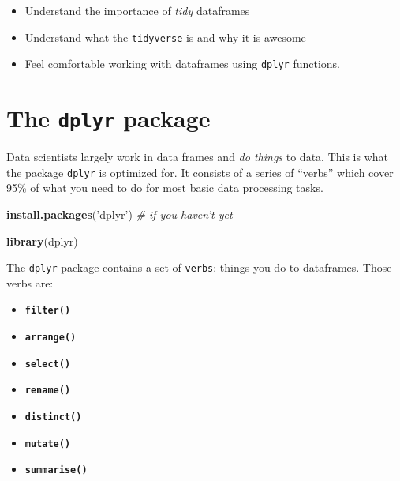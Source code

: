 \documentclass[
]{book}
\newenvironment{Shaded}{\begin{snugshade}}{\end{snugshade}}
\newcommand{\CommentTok}[1]{\textcolor[rgb]{0.56,0.35,0.01}{\textit{#1}}}
\newcommand{\KeywordTok}[1]{\textcolor[rgb]{0.13,0.29,0.53}{\textbf{#1}}}
\newcommand{\NormalTok}[1]{#1}
\newcommand{\StringTok}[1]{\textcolor[rgb]{0.31,0.60,0.02}{#1}}
\providecommand{\tightlist}{%
  \setlength{\itemsep}{0pt}\setlength{\parskip}{0pt}}
\begin{document}
\begin{itemize}
\tightlist
\item
  Understand the importance of \emph{tidy} dataframes
\item
  Understand what the \texttt{tidyverse} is and why it is awesome
\item
  Feel comfortable working with dataframes using \texttt{dplyr} functions.
\end{itemize}

\hypertarget{the-dplyr-package}{%
\section*{\texorpdfstring{The \texttt{dplyr} package}{The dplyr package}}\label{the-dplyr-package}}

Data scientists largely work in data frames and \emph{do things} to data. This is what the package \texttt{dplyr} is optimized for. It consists of a series of ``verbs'' which cover 95\% of what you need to do for most basic data processing tasks.

\begin{Shaded}
\begin{Highlighting}[]
\KeywordTok{install.packages}\NormalTok{(}\StringTok{'dplyr'}\NormalTok{) }\CommentTok{# if you haven't yet}
\end{Highlighting}
\end{Shaded}

\begin{Shaded}
\begin{Highlighting}[]
\KeywordTok{library}\NormalTok{(dplyr)}
\end{Highlighting}
\end{Shaded}

The \texttt{dplyr} package contains a set of \texttt{verbs}: things you do to dataframes. Those verbs are:

\begin{itemize}
\tightlist
\item
  \textbf{\texttt{filter()}}~\\
\item
  \textbf{\texttt{arrange()}}~\\
\item
  \textbf{\texttt{select()}}~\\
\item
  \textbf{\texttt{rename()}}~\\
\item
  \textbf{\texttt{distinct()}}~\\
\item
  \textbf{\texttt{mutate()}}~\\
\item
  \textbf{\texttt{summarise()}}
\end{itemize}
\end{document}
